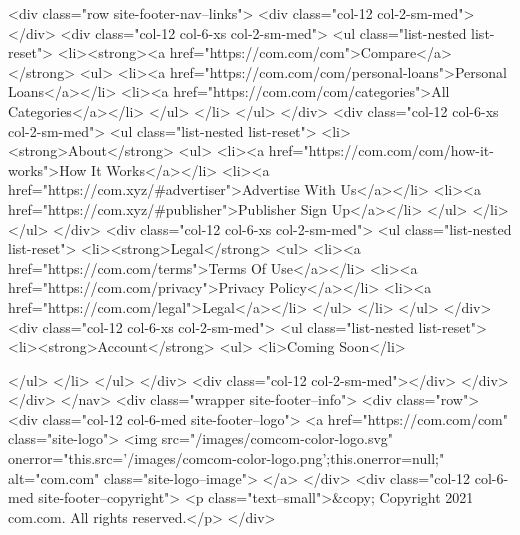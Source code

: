             <div class="row site-footer-nav--links">
                <div class="col-12 col-2-sm-med"></div>
                <div class="col-12 col-6-xs col-2-sm-med">
                    <ul class="list-nested list-reset">
                        <li><strong><a href="https://com.com/com">Compare</a></strong>
                            <ul>
                                <li><a href="https://com.com/com/personal-loans">Personal Loans</a></li>
                                <li><a href="https://com.com/com/categories">All Categories</a></li>
                            </ul>
                        </li>
                    </ul>
                </div>
                <div class="col-12 col-6-xs col-2-sm-med">
                    <ul class="list-nested list-reset">
                        <li><strong>About</strong>
                            <ul>
                                <li><a href="https://com.com/com/how-it-works">How It Works</a></li>
                                <li><a href="https://com.xyz/#advertiser">Advertise With Us</a></li>
                                <li><a href="https://com.xyz/#publisher">Publisher Sign Up</a></li>
                            </ul>
                        </li>
                    </ul>
                </div>
                <div class="col-12 col-6-xs col-2-sm-med">
                    <ul class="list-nested list-reset">
                        <li><strong>Legal</strong>
                            <ul>
                                <li><a href="https://com.com/terms">Terms Of Use</a></li>
                                <li><a href="https://com.com/privacy">Privacy Policy</a></li>
                                <li><a href="https://com.com/legal">Legal</a></li>
                            </ul>
                        </li>
                    </ul>
                </div>
                <div class="col-12 col-6-xs col-2-sm-med">
                    <ul class="list-nested list-reset">
                        <li><strong>Account</strong>
                            <ul>
                                <li>Coming Soon</li>
                                
                                
                                
                                
                                
                                
                            </ul>
                        </li>
                    </ul>
                </div>
                <div class="col-12 col-2-sm-med"></div>
            </div>
        </div>
    </nav>
    <div class="wrapper site-footer--info">
        <div class="row">
            <div class="col-12 col-6-med site-footer--logo">
                <a href="https://com.com/com" class="site-logo">
                    <img src="/images/comcom-color-logo.svg" onerror="this.src='/images/comcom-color-logo.png';this.onerror=null;" alt="com.com" class="site-logo--image">
                </a>
            </div>
            <div class="col-12 col-6-med site-footer--copyright">
                <p class="text--small">&copy; Copyright 2021 com.com. All rights reserved.</p>
            </div>
            
